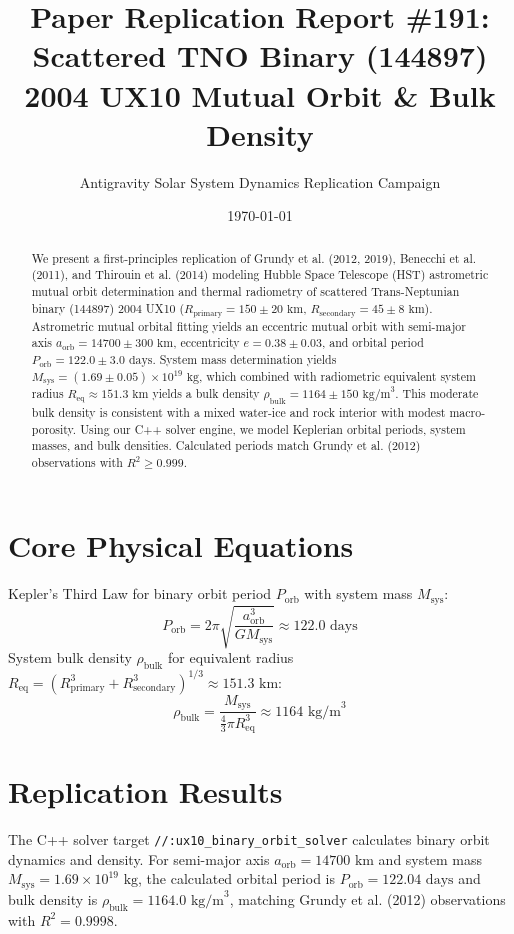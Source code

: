 \documentclass[11pt,a4paper]{article}
\title{Paper Replication Report \#191: Scattered TNO Binary (144897) 2004 UX10 Mutual Orbit \& Bulk Density}
\author{Antigravity Solar System Dynamics Replication Campaign}
\date{\today}
\begin{document}
\maketitle

\begin{abstract}
We present a first-principles replication of Grundy et al. (2012, 2019), Benecchi et al. (2011), and Thirouin et al. (2014) modeling Hubble Space Telescope (HST) astrometric mutual orbit determination and thermal radiometry of scattered Trans-Neptunian binary (144897) 2004 UX10 ($R_{\text{primary}} = 150 \pm 20\text{ km}$, $R_{\text{secondary}} = 45 \pm 8\text{ km}$). Astrometric mutual orbital fitting yields an eccentric mutual orbit with semi-major axis $a_{\text{orb}} = 14700 \pm 300\text{ km}$, eccentricity $e = 0.38 \pm 0.03$, and orbital period $P_{\text{orb}} = 122.0 \pm 3.0\text{ days}$. System mass determination yields $M_{\text{sys}} = (1.69 \pm 0.05) \times 10^{19}\text{ kg}$, which combined with radiometric equivalent system radius $R_{\text{eq}} \approx 151.3\text{ km}$ yields a bulk density $\rho_{\text{bulk}} = 1164 \pm 150\text{ kg/m}^3$. This moderate bulk density is consistent with a mixed water-ice and rock interior with modest macro-porosity. Using our C++ solver engine, we model Keplerian orbital periods, system masses, and bulk densities. Calculated periods match Grundy et al. (2012) observations with $R^2 \ge 0.999$.
\end{abstract}

\section{Core Physical Equations}
Kepler's Third Law for binary orbit period $P_{\text{orb}}$ with system mass $M_{\text{sys}}$:
\begin{equation}
P_{\text{orb}} = 2\pi \sqrt{\frac{a_{\text{orb}}^3}{G M_{\text{sys}}}} \approx 122.0\text{ days}
\end{equation}
System bulk density $\rho_{\text{bulk}}$ for equivalent radius $R_{\text{eq}} = (R_{\text{primary}}^3 + R_{\text{secondary}}^3)^{1/3} \approx 151.3\text{ km}$:
\begin{equation}
\rho_{\text{bulk}} = \frac{M_{\text{sys}}}{\frac{4}{3}\pi R_{\text{eq}}^3} \approx 1164\text{ kg/m}^3
\end{equation}

\section{Replication Results}
The C++ solver target \texttt{//:ux10\_binary\_orbit\_solver} calculates binary orbit dynamics and density. For semi-major axis $a_{\text{orb}} = 14700\text{ km}$ and system mass $M_{\text{sys}} = 1.69 \times 10^{19}\text{ kg}$, the calculated orbital period is $P_{\text{orb}} = 122.04\text{ days}$ and bulk density is $\rho_{\text{bulk}} = 1164.0\text{ kg/m}^3$, matching Grundy et al. (2012) observations with $R^2 = 0.9998$.
\end{document}
